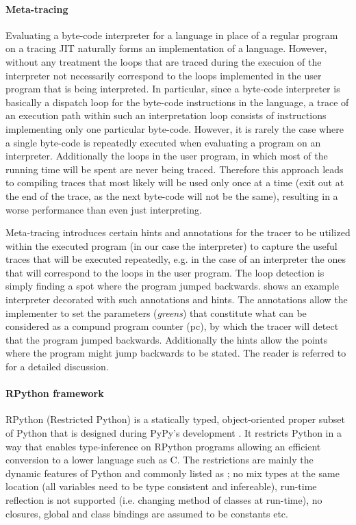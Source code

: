 \paragraph{Meta-tracing}
Evaluating a byte-code interpreter for a language in place of a
regular program on a tracing JIT naturally forms an implementation of
a language. However, without any treatment the loops that are traced
during the execuion of the interpreter not necessarily correspond to
the loops implemented in the user program that is being
interpreted. In particular, since a byte-code interpreter is basically
a dispatch loop for the byte-code instructions in the language, a
trace of an execution path within such an interpretation loop consists
of instructions implementing only one particular byte-code. However,
it is rarely the case where a single byte-code is repeatedly executed
when evaluating a program on an interpreter. Additionally the loops in
the user program, in which most of the running time will be spent are
never being traced. Therefore this approach leads to compiling traces
that most likely will be used only once at a time (exit out at the end
of the trace, as the next byte-code will not be the same), resulting
in a worse performance than even just interpreting.

Meta-tracing introduces certain hints and annotations for the tracer
to be utilized within the executed program (in our case the
interpreter) to capture the useful traces that will be executed
repeatedly, e.g. in the case of an interpreter the ones that will
correspond to the loops in the user program. The loop detection is
simply finding a spot where the program jumped
backwards.  shows an example interpreter
decorated with such annotations and hints. The annotations allow the
implementer to set the parameters (\emph{greens}) that constitute what
can be considered as a compund program counter (pc), by which the
tracer will detect that the program jumped backwards. Additionally the
hints allow the points where the program might jump backwards to be
stated.  The reader is referred to \cite{bolz09} for a detailed
discussion.
\vspace{-0.25cm}
\paragraph{RPython framework}

RPython (Restricted Python) is a statically typed, object-oriented
proper subset of Python that is designed during PyPy's development
\cite{pypy06}. It restricts Python in a way that enables
type-inference on RPython programs allowing an efficient conversion to
a lower language such as C. The restrictions are mainly the dynamic
features of Python and commonly listed as \cite{rpython07,rpython09};
no mix types at the same location (all variables need to be type
consistent and infereable), run-time reflection is not supported
(i.e. changing method of classes at run-time), no closures, global and
class bindings are assumed to be constants etc.


